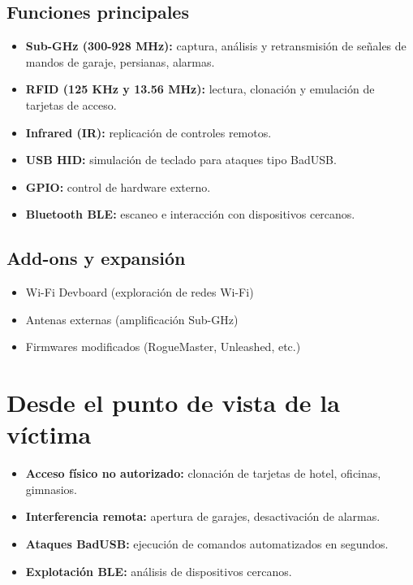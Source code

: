 \documentclass[a4paper,12pt]{article}
\begin{document}
\subsection{Funciones principales}

\begin{itemize}
    \item \textbf{Sub-GHz (300-928 MHz):} captura, análisis y retransmisión de señales de mandos de garaje, persianas, alarmas.
    \item \textbf{RFID (125 KHz y 13.56 MHz):} lectura, clonación y emulación de tarjetas de acceso.
    \item \textbf{Infrared (IR):} replicación de controles remotos.
    \item \textbf{USB HID:} simulación de teclado para ataques tipo BadUSB.
    \item \textbf{GPIO:} control de hardware externo.
    \item \textbf{Bluetooth BLE:} escaneo e interacción con dispositivos cercanos.
\end{itemize}

\subsection{Add-ons y expansión}

\begin{itemize}
    \item Wi-Fi Devboard (exploración de redes Wi-Fi)
    \item Antenas externas (amplificación Sub-GHz)
    \item Firmwares modificados (RogueMaster, Unleashed, etc.)
\end{itemize}

\section{Desde el punto de vista de la víctima}

\begin{itemize}
    \item \textbf{Acceso físico no autorizado:} clonación de tarjetas de hotel, oficinas, gimnasios.
    \item \textbf{Interferencia remota:} apertura de garajes, desactivación de alarmas.
    \item \textbf{Ataques BadUSB:} ejecución de comandos automatizados en segundos.
    \item \textbf{Explotación BLE:} análisis de dispositivos cercanos.
\end{itemize}
\end{document}
